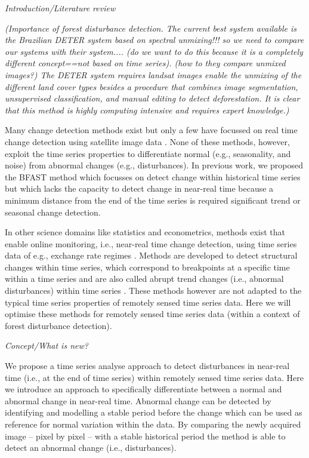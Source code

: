 \documentclass[authoryear,preprint,review,10pt]{elsarticle}
\newcommand{\readme}[1]{\emph{\marginpar{README} (#1)}}
\begin{document}
\emph{Introduction/Literature review}

\readme{Importance of forest disturbance detection.
The current best system available is the Brazilian DETER system based on
spectral unmixing!!! so we need to compare our systems with their system.... (do
we want to do this because it is a completely different concept==not based on
time series).  (how to they compare unmixed images?) The DETER system
requires landsat images enable the unmixing of the different land cover types
besides a procedure that combines image segmentation, unsupervised
classification, and manual editing to detect deforestation. It is clear that
this method is highly computing intensive and requires expert knowledge.}

Many change detection methods exist but only a few have focussed on real time
change detection using satellite image data
\citep{Shimabukuro:2006vb,White2006}. None of these methods, however, exploit
the time series properties to differentiate normal (e.g., seasonality, and noise)
from abnormal changes (e.g., disturbances). In previous work, we proposed the
BFAST method which focusses on detect change within historical time series but
which lacks the capacity to detect change in near-real time because a minimum
distance from the end of the time series is required significant trend or
seasonal change detection.

In other science domains like statistics and econometrics, methods exist that
enable online monitoring, i.e., near-real time change detection, using time
series data of e.g., exchange rate regimes \citep{Zeileis:2010tt}. Methods are
developed to detect structural changes within time series, which correspond to
breakpoints at a specific time within a time series and are also called abrupt
trend changes (i.e., abnormal disturbances) within time series
\citep{Verbesselt2009a}. These methods however are not adapted to the typical
time series properties of remotely sensed time series data. Here we will
optimise these methods for remotely sensed time series data (within a context of
forest disturbance detection).

\emph{Concept/What is new?}

We propose a time series analyse approach to detect disturbances in near-real
time (i.e., at the end of time series) within remotely sensed time series data.
Here we introduce an approach to specifically differentiate between a normal and
abnormal change in near-real time. Abnormal change can be detected by
identifying and modelling a stable period before the change which can be used as
reference for normal variation within the data. By comparing the newly acquired
image -- pixel by pixel -- with a stable historical period the method is able to
detect an abnormal change (i.e., disturbances).
\end{document}
